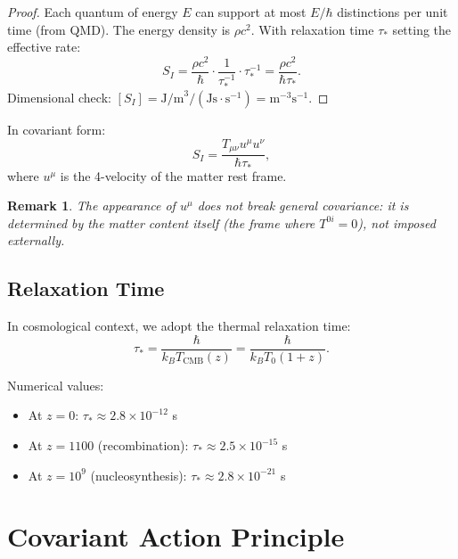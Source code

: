 \documentclass[12pt, a4paper]{article}
\newtheorem{remark}{Remark}
\begin{document}
\begin{proof}
Each quantum of energy $E$ can support at most $E/\hbar$ distinctions per unit time (from QMD). The energy density is $\rho c^2$. With relaxation time $\tau_*$ setting the effective rate:
\[
    S_I = \frac{\rho c^2}{\hbar} \cdot \frac{1}{\tau_*^{-1}} \cdot \tau_*^{-1} = \frac{\rho c^2}{\hbar \tau_*}.
\]
Dimensional check: $[S_I] = \text{J/m}^3 / (\text{Js} \cdot \text{s}^{-1}) = \text{m}^{-3}\text{s}^{-1}$. \checkmark
\end{proof}

In covariant form:
\begin{equation}
    S_I = \frac{T_{\mu\nu} u^\mu u^\nu}{\hbar \tau_*},
    \label{eq:S_I_covariant}
\end{equation}
where $u^\mu$ is the 4-velocity of the matter rest frame.

\begin{remark}
The appearance of $u^\mu$ does not break general covariance: it is determined by the matter content itself (the frame where $T^{0i} = 0$), not imposed externally.
\end{remark}

\subsection{Relaxation Time}

In cosmological context, we adopt the thermal relaxation time:
\begin{equation}
    \tau_* = \frac{\hbar}{k_B T_{\text{CMB}}(z)} = \frac{\hbar}{k_B T_0 (1+z)}.
    \label{eq:tau_cosmo}
\end{equation}

Numerical values:
\begin{itemize}
    \item At $z=0$: $\tau_* \approx 2.8 \times 10^{-12}$ s
    \item At $z=1100$ (recombination): $\tau_* \approx 2.5 \times 10^{-15}$ s
    \item At $z=10^9$ (nucleosynthesis): $\tau_* \approx 2.8 \times 10^{-21}$ s
\end{itemize}


\section{Covariant Action Principle}
\end{document}

